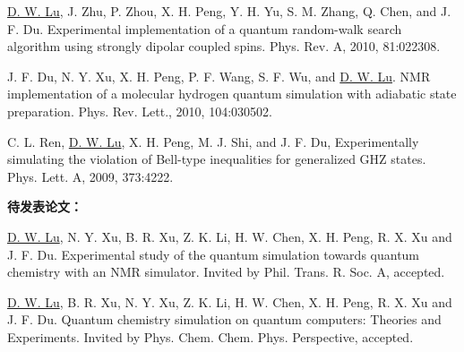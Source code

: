 \begin{publications}
\item \underline{D. W. Lu}, J. Zhu, P. Zhou, X. H. Peng, Y. H. Yu, S. M. Zhang, Q. Chen, and J. F. Du. Experimental implementation of a quantum random-walk search algorithm using strongly dipolar coupled spins. Phys. Rev. A, 2010, 81:022308.

 \item J. F. Du, N. Y. Xu, X. H. Peng, P. F. Wang, S. F. Wu, and \underline{D. W. Lu}.
NMR implementation of a molecular hydrogen quantum simulation with adiabatic state preparation.
Phys. Rev. Lett., 2010, 104:030502.

\item C. L. Ren, \underline{D. W. Lu}, X. H. Peng, M. J. Shi, and J. F. Du, Experimentally simulating the violation of Bell-type inequalities for generalized GHZ states. Phys. Lett. A, 2009, 373:4222.


\end{publications}

\vskip 1cm

\textbf{待发表论文：}

\begin{publications}

\item \underline{D. W. Lu}, N. Y. Xu, B. R. Xu, Z. K. Li, H. W. Chen, X. H. Peng, R. X. Xu and J. F. Du. Experimental study of the quantum
simulation towards quantum chemistry
with an NMR simulator.
Invited by Phil. Trans. R. Soc. A, accepted.

\item \underline{D. W. Lu}, B. R. Xu, N. Y. Xu, Z. K. Li, H. W. Chen, X. H. Peng, R. X. Xu and J. F. Du. Quantum chemistry simulation on quantum computers: Theories
and Experiments. Invited by Phys. Chem. Chem. Phys. Perspective, accepted.


\end{publications} 